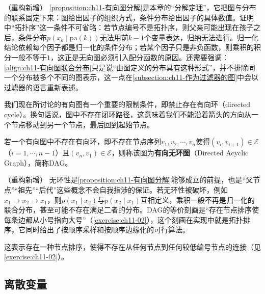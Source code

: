 \documentclass[../../main.tex]{subfiles}
\begin{document}
\begin{remark}（重构新增）
\cref{proposition:ch11-有向图分解}是本章的“分解定理”，它把图与分布的联系固定下来：图给出因子的组织方式，条件分布给出因子的具体数值。证明中“拓扑序”这一条件不可省略：若节点编号不是拓扑序，则父亲可能出现在孩子之后，条件分布$p(x_k\mid\mathrm{pa}(k))$无法用前$k-1$个变量表达，归纳无法进行。归一化结论依赖每个因子都是归一化的条件分布；若某个因子只是非负函数，则乘积的积分一般不等于$1$，这正是无向图必须引入配分函数的原因。还需要强调：\eqref{align:ch11-有向图联合分布}只是说“由图定义的分布具有这种形式”，并不排除同一个分布被多个不同的图表示，这一点在\cref{subsection:ch11-作为过滤器的图}中会以过滤器的语言重新表述。
\end{remark}

我们现在所讨论的有向图有一个重要的限制条件，即禁止存在有向环（directed cycle）。换句话说，图中不存在闭环路径，这意味着我们不能沿着箭头的方向从一个节点移动到另一个节点，最后回到起始节点。

\begin{definition}[有向无环图]\label{definition:ch11-有向无环图}
若一个有向图中不存在有向环，即不存在节点序列$v_1,v_2,\cdots,v_n$使得$(v_i,v_{i+1})\in\mathcal{E}$（$i=1,\cdots,n-1$）且$(v_n,v_1)\in\mathcal{E}$，则称该图为\textbf{有向无环图}（Directed Acyclic Graph），简称DAG。
\end{definition}

\begin{remark}（重构新增）
无环性是\cref{proposition:ch11-有向图分解}能够成立的前提，也是“父节点”“祖先”“后代”这些概念不会自我指涉的保证。若无环性被破坏，例如$x_1\to x_2\to x_1$，则$p(x_1\mid x_2)$与$p(x_2\mid x_1)$互相定义，乘积一般不再是归一化的联合分布，甚至可能不存在满足二者的分布。DAG的等价刻画是“存在节点排序使每条边都从小号指向大号”（\cref{exercise:ch11-02}），这个刻画在实现中就是拓扑排序，它同时给出了按顺序采样和按顺序边缘化的可行算法。
\end{remark}

这表示存在一种节点排序，使得不存在从任何节点到任何较低编号节点的连接（见\cref{exercise:ch11-02}）。

\subsection{离散变量}\label{subsection:ch11-离散变量}
\end{document}

